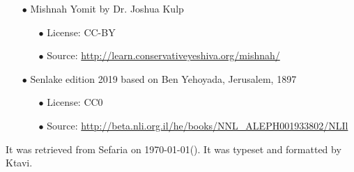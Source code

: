 \documentclass[12pt, openany]{book}
\begin{document}
\begin{minipage}[b][\textheight][b]{\textwidth}
\begin{english}
\begin{itemize}
\begin{itemize}
\end{itemize}
\item[$\bullet$] Mishnah Yomit by Dr. Joshua Kulp
\begin{itemize}
\item[$\bullet$] License: CC-BY
\item[$\bullet$] Source: \url{http://learn.conservativeyeshiva.org/mishnah/}
\end{itemize}
\item[$\bullet$] Senlake edition 2019 based on Ben Yehoyada, Jerusalem, 1897
\begin{itemize}
\item[$\bullet$] License: CC0
\item[$\bullet$] Source: \url{http://beta.nli.org.il/he/books/NNL_ALEPH001933802/NLIl}
\end{itemize}
\end{itemize}
		It was retrieved from Sefaria on \today\space \texthebrew{(\Hebrewtoday)}.  It was typeset and formatted by Ktavi.
		\clearpage
		
	\end{english}
\end{minipage}

\titlelabel{\thetitle\quad}
{\small \tableofcontents}


\clearpage
\mainmatter
{}
\end{document}
